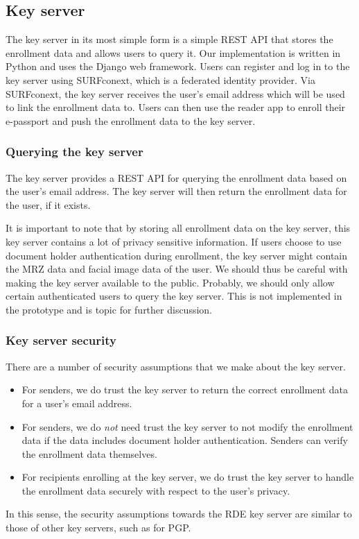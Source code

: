 \subsection{Key server}\label{subsec:key-server}
The key server in its most simple form is a simple REST API that stores the enrollment data and allows users to query it.
Our implementation is written in Python and uses the Django web framework.
Users can register and log in to the key server using SURFconext, which is a federated identity provider.
Via SURFconext, the key server receives the user's email address which will be used to link the enrollment data to.
Users can then use the reader app to enroll their e-passport and push the enrollment data to the key server.

\subsubsection{Querying the key server}\label{subsubsec:querying-the-key-server}
The key server provides a REST API for querying the enrollment data based on the user's email address.
The key server will then return the enrollment data for the user, if it exists.

It is important to note that by storing all enrollment data on the key server, this key server contains a lot of privacy sensitive information.
If users choose to use document holder authentication during enrollment, the key server might contain the MRZ data and facial image data of the user.
We should thus be careful with making the key server available to the public.
Probably, we should only allow certain authenticated users to query the key server.
This is not implemented in the prototype and is topic for further discussion.

\subsubsection{Key server security}\label{subsubsec:key-server-security}
There are a number of security assumptions that we make about the key server.
\begin{itemize}
    \item For senders, we do trust the key server to return the correct enrollment data for a user's email address.
    \item For senders, we do \emph{not} need trust the key server to not modify the enrollment data if the data includes document holder authentication.
    Senders can verify the enrollment data themselves.
    \item For recipients enrolling at the key server, we do trust the key server to handle the enrollment data securely with respect to the user's privacy.
\end{itemize}
In this sense, the security assumptions towards the RDE key server are similar to those of other key servers, such as for PGP.

